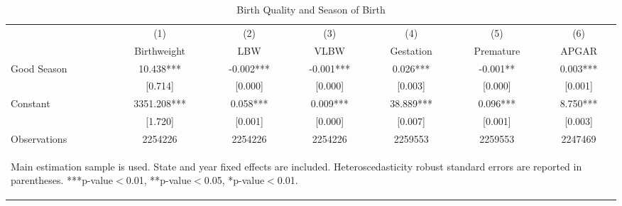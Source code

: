 \documentclass[a4paper, 11.5 pt]{article}
\theoremstyle{plain}
\begin{document}
\begin{doublespace}
\begin{table}[htbp]\centering
\def\sym#1{\ifmmode^{#1}\else\(^{#1}\)\fi}
\caption{Birth Quality and Season of Birth  \label{tab:qualityMainNC}}
\begin{tabular}{l*{6}{c}}
\toprule
                    &\multicolumn{1}{c}{(1)}   &\multicolumn{1}{c}{(2)}   &\multicolumn{1}{c}{(3)}   &\multicolumn{1}{c}{(4)}   &\multicolumn{1}{c}{(5)}   &\multicolumn{1}{c}{(6)}   \\
                    & Birthweight   &         LBW   &        VLBW   &   Gestation   &   Premature   &       APGAR   \\
\midrule
Good Season         &      10.438***&      -0.002***&      -0.001***&       0.026***&      -0.001** &       0.003***\\
                    &     [0.714]   &     [0.000]   &     [0.000]   &     [0.003]   &     [0.000]   &     [0.001]   \\
Constant            &    3351.208***&       0.058***&       0.009***&      38.889***&       0.096***&       8.750***\\
                    &     [1.720]   &     [0.001]   &     [0.000]   &     [0.007]   &     [0.001]   &     [0.003]   \\
\midrule
Observations        &     2254226   &     2254226   &     2254226   &     2259553   &     2259553   &     2247469   \\
\bottomrule
\multicolumn{7}{p{15cm}}{\begin{footnotesize}Main estimation
sample is used. State and year fixed effects are
included. Heteroscedasticity robust standard errors are reported in               parentheses.
***p-value$<$0.01, **p-value$<$0.05, *p-value$<$0.01.
\end{footnotesize}}\end{tabular}\end{table}



\newpage

\end{doublespace}
\end{document}
